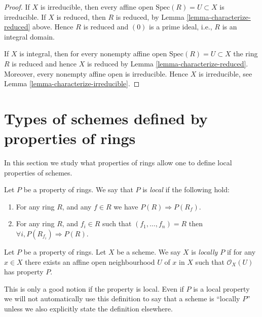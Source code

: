 \begin{proof}
If $X$ is irreducible, then every affine open $\text{Spec}(R) = U \subset X$
is irreducible. If $X$ is reduced, then $R$ is reduced, by
Lemma \ref{lemma-characterize-reduced} above. Hence $R$ is reduced
and $(0)$ is a prime ideal, i.e., $R$ is an integral domain.

\medskip\noindent
If $X$ is integral, then for every nonempty affine open
$\text{Spec}(R) = U \subset X$ the ring $R$ is reduced
and hence $X$ is reduced by Lemma \ref{lemma-characterize-reduced}.
Moreover, every nonempty affine open is irreducible.
Hence $X$ is irreducible, see Lemma \ref{lemma-characterize-irreducible}.
\end{proof}















\section{Types of schemes defined by properties of rings}
\label{section-properties-rings}

\noindent
In this section we study what properties of rings
allow one to define local properties of schemes.

\begin{definition}
\label{definition-property-local}
Let $P$ be a property of rings.
We say that $P$ is {\it local} if the following hold:
\begin{enumerate}
\item For any ring $R$, and any $f \in R$ we have
$P(R) \Rightarrow P(R_f)$.
\item For any ring $R$, and $f_i \in R$ such that
$(f_1, \ldots, f_n) = R$ then
$\forall i, P(R_{f_i}) \Rightarrow P(R)$.
\end{enumerate}
\end{definition}

\begin{definition}
\label{definition-locally-P}
Let $P$ be a property of rings. Let $X$ be a scheme.
We say $X$ is {\it locally $P$} if for any $x \in X$
there exists an affine open neighbourhood $U$ of $x$
in $X$ such that $\mathcal{O}_X(U)$ has property $P$.
\end{definition}

\noindent
This is only a good notion if the property is local.
Even if $P$ is a local property we will not
automatically use this definition to say that a scheme is
``locally $P$'' unless we also explicitly state the definition
elsewhere.

